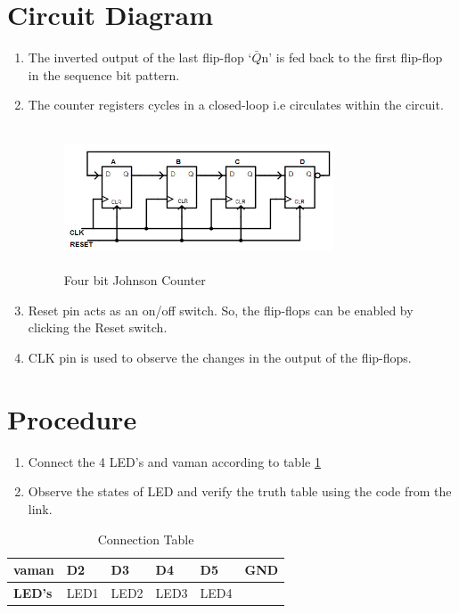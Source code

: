 \documentclass[journal,12pt,twocolumn]{IEEEtran}
\begin{document}
\section{Circuit Diagram}
\begin{enumerate}
\item The inverted output of the last flip-flop ‘$\bar{Q}$n’ is fed back to the first flip-flop in the sequence bit pattern. 
\item The counter registers cycles in a closed-loop i.e circulates within the circuit.
\begin{figure}[h]
    \centering
    \includegraphics[width=8cm, height=4.2cm]{counter.jpg}
    
    \caption{Four bit Johnson Counter}

\end{figure}
\item Reset pin acts as an on/off switch. So, the flip-flops can be enabled by clicking the Reset switch.

\item CLK pin is used to observe the changes in the output of the flip-flops.
\end{enumerate}



\section{Procedure}
\begin{enumerate}
\item Connect the 4 LED's and vaman according to table \ref{table:1}
\item Observe the states of LED and verify the truth table using the code from the link.



\end{enumerate}


\begin{table}[h]
\centering
\large
\begin{tabular}{|l|l|l|l|l|l|}
\hline
\textbf{vaman} & D2   & D3   & D4   & D5   & GND \\ \hline
\textbf{LED's}   & LED1 & LED2 & LED3 & LED4 &     \\ \hline
\end{tabular}
\caption{Connection Table}
\label{table:1}
\end{table} 
\end{document}
